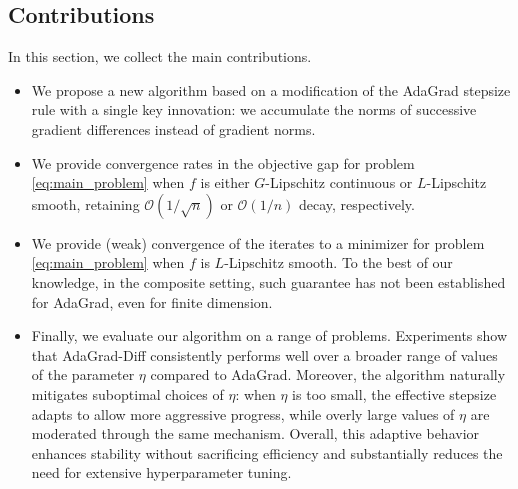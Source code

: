 \documentclass[11pt]{article}
\theoremstyle{plain}
\theoremstyle{definition}
\theoremstyle{remark}
\begin{document}
\subsection{Contributions}
In this section, we collect the main contributions. 
\begin{itemize}
\item We propose a new algorithm based on a modification of the AdaGrad stepsize rule with a single key innovation: we accumulate the norms of successive gradient differences instead of gradient norms. 
\item We provide convergence rates in the objective gap for problem \eqref{eq:main_problem} when $f$ is either $G$-Lipschitz continuous or $L$-Lipschitz smooth, retaining $\mathcal{O}\left(1/\sqrt{n}\right)$ or $\mathcal{O}\left(1/n\right)$ decay, respectively.
\item We provide (weak) convergence of the iterates to a minimizer for problem \eqref{eq:main_problem} when $f$ is $L$-Lipschitz smooth. To the best of our knowledge, in the composite setting, such guarantee has not been established for AdaGrad, even for finite dimension.
\item Finally, we evaluate our algorithm on a range of problems. 
Experiments show that AdaGrad-Diff consistently performs well over a broader range of values of the parameter $\eta$ compared to AdaGrad. Moreover, the algorithm naturally mitigates suboptimal choices of $\eta$: when $\eta$ is too small, the effective stepsize adapts to allow more aggressive progress, while overly large values of $\eta$ are moderated through the same mechanism. Overall, this adaptive behavior enhances stability without sacrificing efficiency and substantially reduces the need for extensive hyperparameter tuning.
\end{itemize}
\end{document}

